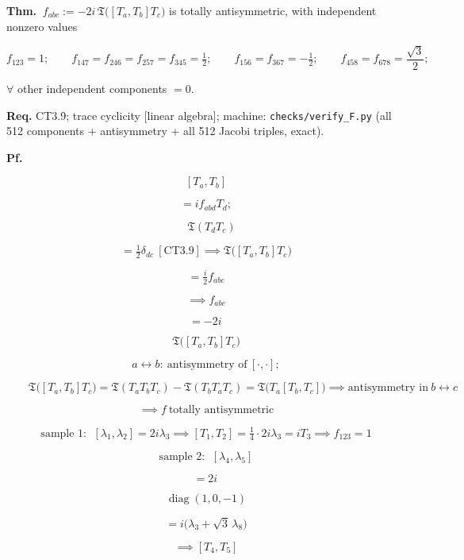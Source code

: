 \begin{theorem}\label{tag:CT3-21}
\textbf{Thm.} $\ f_{abc}:=-2i\,\mathfrak T\bigl([T_a,T_b]T_c\bigr)$ is totally antisymmetric, with independent nonzero values

\[
f_{123}=1;\qquad
f_{147}=f_{246}=f_{257}=f_{345}=\tfrac12;\qquad
f_{156}=f_{367}=-\tfrac12;\qquad
f_{458}=f_{678}=\frac{\sqrt3}{2};
\]

$\forall$ other independent components $=0$.

\textbf{Req.} CT3.9; trace cyclicity [linear algebra]; machine: \texttt{checks/\allowbreak{}verify\_\allowbreak{}F.py} (all 512 components + antisymmetry + all 512 Jacobi triples, exact).

\textbf{Pf.}

\[
[T_a,T_b]
\]

\[
= if_{abd}T_d;
\]

\[
\quad\mathfrak T(T_dT_c)
\]

\[
= \tfrac12\delta_{dc}\ [\mathrm{CT3.9}]\implies\mathfrak T\bigl([T_a,T_b]T_c\bigr)
\]

\[
= \tfrac i2f_{abc}
\]

\[
\implies f_{abc}
\]

\[
= -2i\,
\]

\[
\mathfrak T\bigl([T_a,T_b]T_c\bigr)
\]

\[
a\leftrightarrow b:\ \text{antisymmetry of}\ [\cdot,\cdot];
\]

\[
\qquad \mathfrak T\bigl([T_a,T_b]T_c\bigr)=\mathfrak T(T_aT_bT_c)-\mathfrak T(T_bT_aT_c)=\mathfrak T\bigl(T_a[T_b,T_c]\bigr)\implies\text{antisymmetry in}\ b\leftrightarrow c
\]

\[
\implies f\ \text{totally antisymmetric}
\]

\[
\text{sample }1:\ \ [\lambda_1,\lambda_2]=2i\lambda_3\implies[T_1,T_2]=\tfrac14\cdot2i\lambda_3=iT_3\implies f_{123}=1
\]

\[
\text{sample }2:\ \ [\lambda_4,\lambda_5]
\]

\[
= 2i\,
\]

\[
\operatorname{diag}(1,0,-1)
\]

\[
= i\bigl(\lambda_3+\sqrt3\,\lambda_8\bigr)
\]

\[
\implies [T_4,T_5]
\]


\end{theorem}
